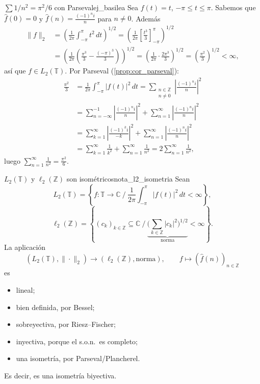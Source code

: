 \begin{ejemplo}{$\sum 1/n^2 = \pi^2/6$ con Parseval}{ej_basilea}
Sea $f(t) = t$, $-\pi \le t \le \pi$. Sabemos que $\hat{f}(0) = 0$ y $\hat{f}(n) = \frac{(-1)^n i}{n}$ para $n \ne 0$. Además
\begin{align*}
\|f\|_2 &= \left(\frac{1}{2\pi}\int_{-\pi}^{\pi}t^2\,dt\right)^{1/2} = \left(\frac{1}{2\pi}\left[\frac{t^3}{3}\right]_{-\pi}^{\pi}\right)^{1/2} \\
&= \left(\frac{1}{2\pi}\left(\frac{\pi^3}{3} - \frac{(-\pi)^3}{3}\right)\right)^{1/2} = \left(\frac{1}{2\pi}\cdot\frac{2\pi^3}{3}\right)^{1/2} = \left(\frac{\pi^2}{3}\right)^{1/2} < \infty,
\end{align*}
así que $f \in L_2(\mathbb{T})$. Por Parseval (\cref{prop:cor_parseval}):
\begin{align*}
\frac{\pi^2}{3} &= \frac{1}{2\pi}\int_{-\pi}^{\pi}|f(t)|^2\,dt = \sum_{\substack{n\in\mathbb{Z}\\ n\ne0}}\left|\frac{(-1)^n i}{n}\right|^2 \\
&= \sum_{n=-\infty}^{-1}\left|\frac{(-1)^n i}{n}\right|^2 + \sum_{n=1}^{\infty}\left|\frac{(-1)^n i}{n}\right|^2 \\
&= \sum_{k=1}^{\infty}\left|\frac{(-1)^k i}{-k}\right|^2 + \sum_{n=1}^{\infty}\left|\frac{(-1)^n i}{n}\right|^2 \\
&= \sum_{k=1}^{\infty}\frac{1}{k^2} + \sum_{n=1}^{\infty}\frac{1}{n^2} = 2\sum_{n=1}^{\infty}\frac{1}{n^2},
\end{align*}
luego $\displaystyle\sum_{n=1}^{\infty}\frac{1}{n^2} = \frac{\pi^2}{6}$.
\end{ejemplo}

\begin{nota}{$L_2(\mathbb{T})$ y $\ell_2(\mathbb{Z})$ son isométricos}{nota_l2_isometria}
Sean
\[
L_2(\mathbb{T}) = \left\{f : \mathbb{T} \to \mathbb{C} \ \Big/\ \frac{1}{2\pi}\int_{-\pi}^{\pi}|f(t)|^2\,dt < \infty\right\},
\]
\[
\ell_2(\mathbb{Z}) = \left\{(c_k)_{k\in\mathbb{Z}} \subseteq \mathbb{C} \ \Big/\ \underbrace{\Big(\sum_{k\in\mathbb{Z}}|c_k|^2\Big)^{1/2}}_{\text{norma}} < \infty\right\}.
\]
La aplicación
\[
(L_2(\mathbb{T}), \|\cdot\|_2) \longrightarrow (\ell_2(\mathbb{Z}), \text{norma}), \qquad f \longmapsto (\hat{f}(n))_{n\in\mathbb{Z}}
\]
es
\begin{itemize}
\item lineal;
\item bien definida, por Bessel;
\item sobreyectiva, por Riesz--Fischer;
\item inyectiva, porque el s.o.n.\ es completo;
\item una isometría, por Parseval/Plancherel.
\end{itemize}
Es decir, es una isometría biyectiva.
\end{nota}

